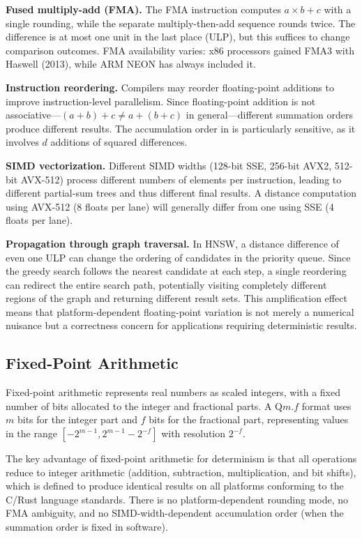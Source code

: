 \documentclass[10pt,journal]{IEEEtran}
\newcommand{\hnsw}{\textsc{HNSW}}
\begin{document}
\textbf{Fused multiply-add (FMA).} The FMA instruction computes $a \times b + c$ with a single rounding, while the separate multiply-then-add sequence rounds twice. The difference is at most one unit in the last place (ULP), but this suffices to change comparison outcomes. FMA availability varies: x86 processors gained FMA3 with Haswell (2013), while ARM NEON has always included it.

\textbf{Instruction reordering.} Compilers may reorder floating-point additions to improve instruction-level parallelism. Since floating-point addition is not associative---$(a + b) + c \neq a + (b + c)$ in general---different summation orders produce different results. The accumulation order in  is particularly sensitive, as it involves $d$ additions of squared differences.

\textbf{SIMD vectorization.} Different SIMD widths (128-bit SSE, 256-bit AVX2, 512-bit AVX-512) process different numbers of elements per instruction, leading to different partial-sum trees and thus different final results. A distance computation using AVX-512 (8 floats per lane) will generally differ from one using SSE (4 floats per lane).

\textbf{Propagation through graph traversal.} In \hnsw{}, a distance difference of even one ULP can change the ordering of candidates in the priority queue. Since the greedy search follows the nearest candidate at each step, a single reordering can redirect the entire search path, potentially visiting completely different regions of the graph and returning different result sets. This amplification effect means that platform-dependent floating-point variation is not merely a numerical nuisance but a correctness concern for applications requiring deterministic results.

\subsection{Fixed-Point Arithmetic}

Fixed-point arithmetic represents real numbers as scaled integers, with a fixed number of bits allocated to the integer and fractional parts. A Q$m$.$f$ format uses $m$ bits for the integer part and $f$ bits for the fractional part, representing values in the range $[-2^{m-1}, 2^{m-1} - 2^{-f}]$ with resolution $2^{-f}$.

The key advantage of fixed-point arithmetic for determinism is that all operations reduce to integer arithmetic (addition, subtraction, multiplication, and bit shifts), which is defined to produce identical results on all platforms conforming to the C/Rust language standards. There is no platform-dependent rounding mode, no FMA ambiguity, and no SIMD-width-dependent accumulation order (when the summation order is fixed in software).
\end{document}
